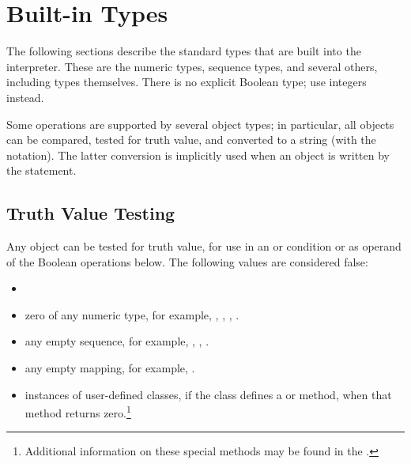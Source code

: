 \section{Built-in Types \label{types}}

The following sections describe the standard types that are built into
the interpreter.  These are the numeric types, sequence types, and
several others, including types themselves.  There is no explicit
Boolean type; use integers instead.

Some operations are supported by several object types; in particular,
all objects can be compared, tested for truth value, and converted to
a string (with the  notation).  The latter
conversion is implicitly used when an object is written by the
 statement.


\subsection{Truth Value Testing \label{truth}}

Any object can be tested for truth value, for use in an  or
 condition or as operand of the Boolean operations below.
The following values are considered false:

\begin{itemize}

\item	{}

\item	zero of any numeric type, for example, , ,
        , .

\item	any empty sequence, for example, , \code{()}, \code{[]}.

\item	any empty mapping, for example, \code{\{\}}.

\item	instances of user-defined classes, if the class defines a
	 or  method, when that
	method returns zero.\footnote{Additional information on these
special methods may be found in the .}

\end{itemize}

